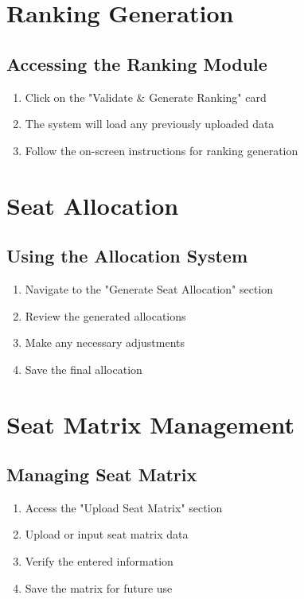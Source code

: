 \documentclass[12pt,a4paper]{article}
\begin{document}
\section{Ranking Generation}
\subsection{Accessing the Ranking Module}
\begin{enumerate}
    \item Click on the "Validate \& Generate Ranking" card
    \item The system will load any previously uploaded data
    \item Follow the on-screen instructions for ranking generation
\end{enumerate}

\section{Seat Allocation}
\subsection{Using the Allocation System}
\begin{enumerate}
    \item Navigate to the "Generate Seat Allocation" section
    \item Review the generated allocations
    \item Make any necessary adjustments
    \item Save the final allocation
\end{enumerate}

\section{Seat Matrix Management}
\subsection{Managing Seat Matrix}
\begin{enumerate}
    \item Access the "Upload Seat Matrix" section
    \item Upload or input seat matrix data
    \item Verify the entered information
    \item Save the matrix for future use
\end{enumerate}
\end{document}
